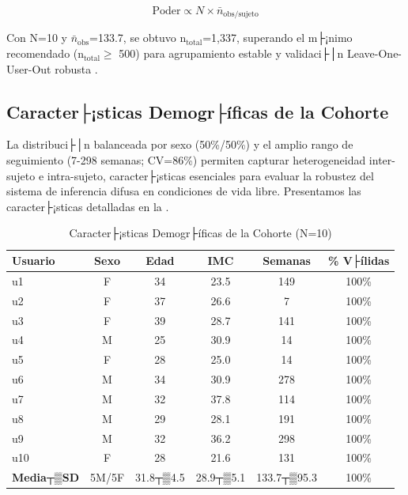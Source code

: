 \begin{equation}
\text{Poder} \propto N \times \bar{n}_{\text{obs/sujeto}}
\label{eq:poder_longitudinal}
\end{equation}

Con N=10 y $\bar{n}_{\text{obs}}$=133.7, se obtuvo n$_{\text{total}}$=1,337, superando el m├¡nimo recomendado (n$_{\text{total}} \geq$ 500) para agrupamiento estable y validaci├│n Leave-One-User-Out robusta \cite{Alinia2020}.

\subsection{Caracter├¡sticas Demogr├íficas de la Cohorte}
\label{subsec:caracteristicas_cohorte}

La distribuci├│n balanceada por sexo (50\%/50\%) y el amplio rango de seguimiento (7-298 semanas; CV=86\%) permiten capturar heterogeneidad inter-sujeto e intra-sujeto, caracter├¡sticas esenciales para evaluar la robustez del sistema de inferencia difusa en condiciones de vida libre. Presentamos las caracter├¡sticas detalladas en la .

\begin{table}[htbp]
\centering
\caption{Caracter├¡sticas Demogr├íficas de la Cohorte (N=10)}
\label{tab:cohorte_caracteristicas}
\begingroup
\setlength{\tabcolsep}{5pt}
\renewcommand{\arraystretch}{1.1}
\small
\begin{tabular}{@{}lccccc@{}}
\toprule
\textbf{Usuario} & \textbf{Sexo} & \textbf{Edad} & \textbf{IMC} & \textbf{Semanas} & \textbf{\% V├ílidas} \\
\midrule
u1 & F & 34 & 23.5 & 149 & 100\% \\
u2 & F & 37 & 26.6 & 7   & 100\% \\
u3 & F & 39 & 28.7 & 141 & 100\% \\
u4 & M & 25 & 30.9 & 14  & 100\% \\
u5 & F & 28 & 25.0 & 14  & 100\% \\
u6 & M & 34 & 30.9 & 278 & 100\% \\
u7 & M & 32 & 37.8 & 114 & 100\% \\
u8 & M & 29 & 28.1 & 191 & 100\% \\
u9 & M & 32 & 36.2 & 298 & 100\% \\
u10 & F & 28 & 21.6 & 131 & 100\% \\
\midrule
\textbf{Media┬▒SD} & 5M/5F & 31.8┬▒4.5 & 28.9┬▒5.1 & 133.7┬▒95.3 & 100\% \\
\bottomrule
\end{tabular}
\endgroup
\end{table}

